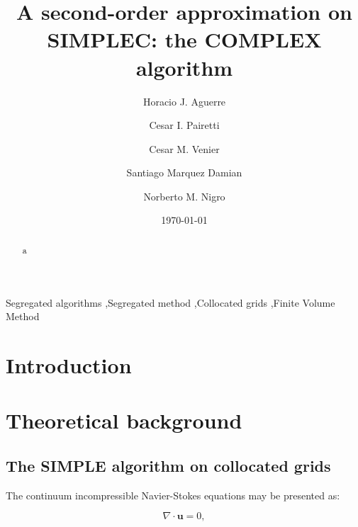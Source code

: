 \documentclass[final,3p,times,10pt,onecolumn]{myElsarticle}
\date{\today}
\numberwithin{equation}{section}
\begin{document}
\begin{frontmatter}

\title{A second-order approximation on SIMPLEC: the COMPLEX algorithm}
 
\author[a,e]{Horacio J. Aguerre}
\author[b,a]{Cesar I. Pairetti}
\author[a,b]{Cesar M. Venier}
\author[a,c]{Santiago Marquez Damian}
\author[a,d]{Norberto M. Nigro}

\address[a]{Centro de Investigación de Métodos Computacionales, CONICET-UNL, Santa Fe, Argentina}
\address[b]{Escuela de Ingenier\'ia Mec\'anica, Facultad de Ciencias Exactas, Ingenieria y Agrimensura, Universidad Nacional de Rosario, Rosario, Argentina}
\address[c]{Facultad Regional Santa Fe, Universidad Tecnologica Nacional, Santa Fe, Argentina}
\address[d]{Facultad de Ingeniería y Ciencias Hídricas, Universidad Nacional del Litoral, Santa Fe, Argentina}
\address[e]{Facultad Regional Concepción de Uruguay, Universidad Tecnologica Nacional, Concepción del Uruguay, Argentina}

\begin{abstract}
a
\end{abstract}

\begin{keyword}
Segregated algorithms \sep Segregated method \sep Collocated grids \sep Finite Volume Method 
\end{keyword}
\end{frontmatter}

\section{Introduction}


\section{Theoretical background} \label{sec:theory}

\subsection{The SIMPLE algorithm on collocated grids}

The continuum incompressible Navier-Stokes equations may be presented as:

\begin{equation}
\displaystyle \nabla \cdotp \boldsymbol{u} = 0, 
\label{eq:mass1}
\end{equation}
\end{document}
